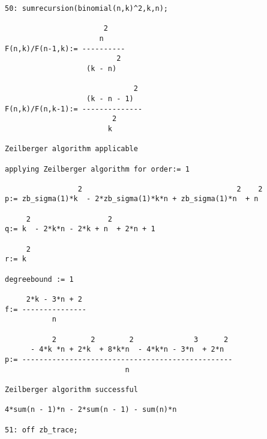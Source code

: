 \vspace*{3mm}
{\footnotesize
\begin{verbatim}
50: sumrecursion(binomial(n,k)^2,k,n);

                       2
                      n
F(n,k)/F(n-1,k):= ----------
                          2
                   (k - n)

                              2
                   (k - n - 1)
F(n,k)/F(n,k-1):= --------------
                         2
                        k

Zeilberger algorithm applicable

applying Zeilberger algorithm for order:= 1

                 2                                    2    2
p:= zb_sigma(1)*k  - 2*zb_sigma(1)*k*n + zb_sigma(1)*n  + n

     2                  2
q:= k  - 2*k*n - 2*k + n  + 2*n + 1

     2
r:= k

degreebound := 1

     2*k - 3*n + 2
f:= ---------------
           n

           2        2        2              3      2
      - 4*k *n + 2*k  + 8*k*n  - 4*k*n - 3*n  + 2*n
p:= -------------------------------------------------
                            n

Zeilberger algorithm successful

4*sum(n - 1)*n - 2*sum(n - 1) - sum(n)*n

51: off zb_trace;
\end{verbatim}
}\noindent

